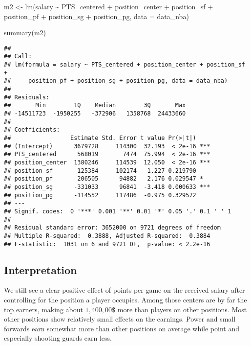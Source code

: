 \documentclass[
]{book}
\newenvironment{Shaded}{\begin{snugshade}}{\end{snugshade}}
\newcommand{\AttributeTok}[1]{\textcolor[rgb]{0.77,0.63,0.00}{#1}}
\newcommand{\AttributeTok}[1]{\textcolor[rgb]{0.13,0.29,0.53}{#1}}
\newcommand{\FunctionTok}[1]{\textcolor[rgb]{0.00,0.00,0.00}{#1}}
\newcommand{\FunctionTok}[1]{\textcolor[rgb]{0.13,0.29,0.53}{\textbf{#1}}}
\newcommand{\NormalTok}[1]{#1}
\newcommand{\OtherTok}[1]{\textcolor[rgb]{0.56,0.35,0.01}{#1}}
\newcommand{\SpecialCharTok}[1]{\textcolor[rgb]{0.00,0.00,0.00}{#1}}
\newcommand{\SpecialCharTok}[1]{\textcolor[rgb]{0.81,0.36,0.00}{\textbf{#1}}}
\begin{document}
\begin{Shaded}
\begin{Highlighting}[]
\NormalTok{m2 }\OtherTok{\textless{}{-}} \FunctionTok{lm}\NormalTok{(salary }\SpecialCharTok{\textasciitilde{}}\NormalTok{ PTS\_centered }\SpecialCharTok{+}\NormalTok{ position\_center }\SpecialCharTok{+}\NormalTok{ position\_sf }\SpecialCharTok{+}\NormalTok{  position\_pf }\SpecialCharTok{+}\NormalTok{ position\_sg }\SpecialCharTok{+}\NormalTok{ position\_pg, }\AttributeTok{data =}\NormalTok{ data\_nba)}

\FunctionTok{summary}\NormalTok{(m2)}
\end{Highlighting}
\end{Shaded}

\begin{verbatim}
## 
## Call:
## lm(formula = salary ~ PTS_centered + position_center + position_sf + 
##     position_pf + position_sg + position_pg, data = data_nba)
## 
## Residuals:
##       Min        1Q    Median        3Q       Max 
## -14511723  -1950255   -372906   1358768  24433660 
## 
## Coefficients:
##                 Estimate Std. Error t value Pr(>|t|)    
## (Intercept)      3679728     114300  32.193  < 2e-16 ***
## PTS_centered      568019       7474  75.994  < 2e-16 ***
## position_center  1380246     114539  12.050  < 2e-16 ***
## position_sf       125384     102174   1.227 0.219790    
## position_pf       206505      94882   2.176 0.029547 *  
## position_sg      -331033      96841  -3.418 0.000633 ***
## position_pg      -114552     117486  -0.975 0.329572    
## ---
## Signif. codes:  0 '***' 0.001 '**' 0.01 '*' 0.05 '.' 0.1 ' ' 1
## 
## Residual standard error: 3652000 on 9721 degrees of freedom
## Multiple R-squared:  0.3888, Adjusted R-squared:  0.3884 
## F-statistic:  1031 on 6 and 9721 DF,  p-value: < 2.2e-16
\end{verbatim}

\hypertarget{interpretation-2}{%
\subsection{Interpretation}\label{interpretation-2}}

We still see a clear positive effect of points per game on the received salary
after controlling for the position a player occupies. Among those centers are by
far the top earners, making about \(1,400,00\$\) more than players on other
positions. Most other positions show relatively small effects on the earnings.
Power and small forwards earn somewhat more than other positions on average
while point and especially shooting guards earn less.
\end{document}
